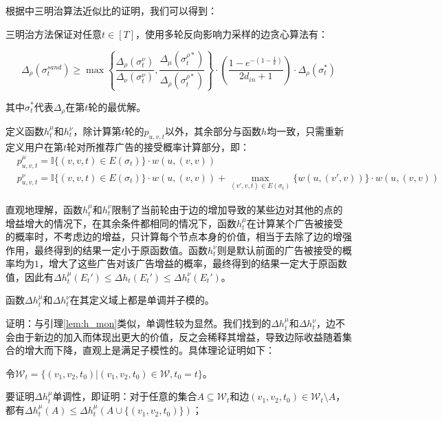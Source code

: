 根据\parencite{sandwich}中三明治算法近似比的证明，我们可以得到：

\begin{theorem}
\label{thm:sand}
三明治方法保证对任意$t \in [T]$，使用多轮反向影响力采样的边贪心算法有：

\begin{equation}
    \Delta_\rho(\sigma_t^{sand}) \ge \max\left\{\frac{\Delta_\rho(\sigma_t^\nu)}{\Delta_\nu(\sigma_t^\nu)},\frac{\Delta_\mu(\sigma_t^{\rho*})}{\Delta_\rho(\sigma_t^{\rho*})} \right\} \cdot (\frac{1-e^{-(1-\frac{1}{k})}}{2d_{in}+1})\cdot \Delta_\rho(\sigma_t^{*})
\end{equation}
\end{theorem}

\noindent 其中$\sigma_t^{*}$代表$\Delta_\rho$在第$t$轮的最优解。

定义函数$h_t^\mu$和$h_t^\nu$，除计算第$t$轮的$p_{u,v,t}$以外，其余部分与函数$h$均一致，只需重新定义用户在第$t$轮对所推荐广告的接受概率计算部分，即：
\begin{align}
    &p_{u,v,t}^\mu=\mathbb{I}\{(v,v,t)\in E(\sigma_t)\}\cdot w(u,(v,v)) \label{equ:def_mu}\\
    &p_{u,v,t}^\nu=\mathbb{I}\{(v,v,t)\in E(\sigma_t)\}\cdot w(u,(v,v)) + \max_{(v',v,t)\in E(\sigma_t)}\{w(u,(v',v))\}\cdot w(u,(v,v)) \label{equ:def_nu}
\end{align}

直观地理解，函数$h_t^\mu$和$h_t^\nu$限制了当前轮由于边的增加导致的某些边对其他的点的增益增大的情况下，在其余条件都相同的情况下，函数$h_t^\mu$在计算某个广告被接受的概率时，不考虑边的增益，只计算每个节点本身的价值，相当于去除了边的增强作用，最终得到的结果一定小于原函数值。函数$h_t^\nu$则是默认前面的广告被接受的概率均为$1$，增大了这些广告对该广告增益的概率，最终得到的结果一定大于原函数值，因此有$\Delta h_t^\mu(E_t') \le \Delta h_t(E_t') \le \Delta h_t^\nu(E_t')$。

\begin{lemma}
\label{lem:mon_sub}
函数$\Delta h_t^\mu$和$ \Delta h_t^\nu$在其定义域上都是单调并子模的。
\end{lemma}

\noindent 证明：与引理\ref{lem:h_mon}类似，单调性较为显然。我们找到的$\Delta h_t^\mu$和$ \Delta h_t^\nu$，边不会由于新边的加入而体现出更大的价值，反之会稀释其增益，导致边际收益随着集合的增大而下降，直观上是满足子模性的。具体理论证明如下：

令$\mathcal{W}_t=\{(v_1,v_2,t_0) |(v_1,v_2,t_0) \in \mathcal{W},t_0=t\}$。

要证明$\Delta h_t^\mu$单调性，即证明：对于任意的集合$A \subseteq \mathcal{W}_t$和边$(v_1,v_2,t_0) \in \mathcal{W}_t\setminus A$，都有$\Delta h_t^\mu(A)\le \Delta h_t^\mu(A\cup\{(v_1,v_2,t_0)\})$；

